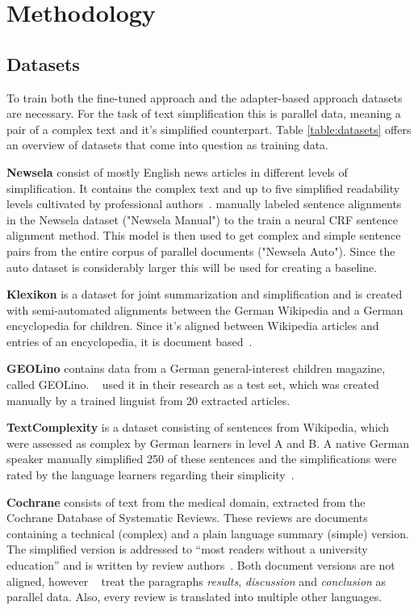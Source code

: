 \section{Methodology}

\subsection{Datasets}
To train both the fine-tuned approach and the adapter-based approach datasets are necessary.
For the task of text simplification this is parallel data, meaning a pair of a complex text and it's simplified counterpart.
Table \ref{table:datasets} offers an overview of datasets that come into question as training data.

\textbf{Newsela} consist of mostly English news articles in different levels of simplification.
It contains the complex text and up to five simplified readability levels cultivated by professional authors~\cite{Xu2015}.
\citet{Jiang2020} manually labeled sentence alignments in the Newsela dataset ("Newsela Manual") to the train a neural CRF
sentence alignment method. This model is then used to get complex and simple sentence pairs from the entire corpus of
parallel documents ("Newsela Auto").
Since the auto dataset is considerably larger this will be used for creating a baseline.

\textbf{Klexikon} is a dataset for joint summarization and simplification and is created with semi-automated alignments between the German
Wikipedia and a German encyclopedia for children. Since it's aligned between Wikipedia articles and entries of an encyclopedia, it is document based~\cite{Aumiller2022}.

\textbf{GEOLino} contains data from a German general-interest children magazine, called GEOLino. ~\citet{Mallinson2020} used it in their research as a test set,
which was created manually by a trained linguist from 20 extracted articles.

\textbf{TextComplexity} is a dataset consisting of sentences from Wikipedia, which were assessed as complex by German learners in level
A and B. A native German speaker manually simplified 250 of these sentences and the simplifications were rated by the language learners
regarding their simplicity~\cite{Mallinson2020}.

\textbf{Cochrane} consists of text from the medical domain, extracted from the Cochrane Database of Systematic Reviews.
These reviews are documents containing a technical (complex) and a plain language summary (simple) version.
The simplified version is addressed to ``most readers without a university education'' and is written by review authors~\cite{Devaraj2021}.
Both document versions are not aligned, however ~\citet{Devaraj2021} treat the paragraphs \emph{results}, \emph{discussion} and \emph{conclusion}
as parallel data.
Also, every review is translated into multiple other languages.

